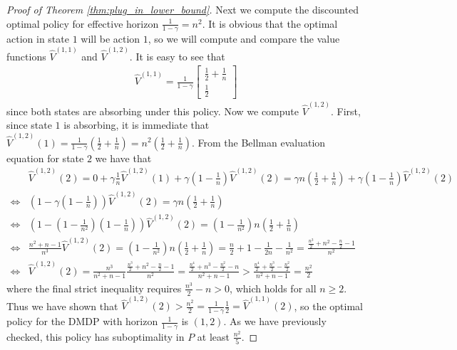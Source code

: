 \documentclass{article}
\theoremstyle{plain}
\theoremstyle{plain}
\theoremstyle{remark}
\theoremstyle{plain}
\theoremstyle{plain}
\newcommand{\Vhat}{\widehat{V}}
\begin{document}
\begin{proof}[Proof of Theorem \ref{thm:plug_in_lower_bound}]
Next we compute the discounted optimal policy for effective horizon $\frac{1}{1-\gamma} = n^2$. It is obvious that the optimal action in state $1$ will be action $1$, so we will compute and compare the value functions $\Vhat^{(1,1)}$ and $\Vhat^{(1,2)}$. It is easy to see that
\begin{align}
    \Vhat^{(1,1)} = \frac{1}{1-\gamma}\begin{bmatrix}
    \frac{1}{2} + \frac{1}{n } \\ \frac{1}{2} 
\end{bmatrix} \label{eq:1,1policy_valfn}
\end{align}
since both states are absorbing under this policy. Now we compute $\Vhat^{(1,2)}$. First, since state $1$ is absorbing, it is immediate that $\Vhat^{(1,2)}(1) = \frac{1}{1-\gamma} \left(\frac{1}{2} +\frac{1}{n} \right) = n^2 \left(\frac{1}{2} +\frac{1}{n} \right)$. From the Bellman evaluation equation for state $2$ we have that
\begin{align*}
    & \Vhat^{(1,2)}(2) = 0 + \gamma \frac{1}{n} \Vhat^{(1,2)}(1) + \gamma \left(1-\frac{1}{n}\right)   \Vhat^{(1,2)}(2) = \gamma n \left(\frac{1}{2} +\frac{1}{n} \right) + \gamma \left(1-\frac{1}{n}\right)   \Vhat^{(1,2)}(2) \\
    \iff & \left(1 - \gamma \left(1-\frac{1}{n}\right) \right) \Vhat^{(1,2)}(2) = \gamma n \left(\frac{1}{2} +\frac{1}{n} \right) \\
    \iff & \left(1 -  \left(1-\frac{1}{n^2}\right) \left(1-\frac{1}{n}\right) \right) \Vhat^{(1,2)}(2) =  \left(1-\frac{1}{n^2}\right) n \left(\frac{1}{2} +\frac{1}{n} \right) \\
    \iff & \frac{n^2 + n - 1}{n^3} \Vhat^{(1,2)}(2) =  \left(1-\frac{1}{n^2}\right) n \left(\frac{1}{2} +\frac{1}{n} \right) = \frac{n}{2} + 1 - \frac{1}{2n} - \frac{1}{n^2}  = \frac{\frac{n^3}{2} + n^2 - \frac{n}{2} - 1}{n^2}\\
     \iff &  \Vhat^{(1,2)}(2)  = \frac{n^3}{n^2 + n - 1} \frac{\frac{n^3}{2} + n^2 - \frac{n}{2} - 1}{n^2} = \frac{\frac{n^4}{2}+ n^3 - \frac{n^2}{2} - n}{n^2 + n - 1} > \frac{\frac{n^4}{2}+ \frac{n^3}{2} - \frac{n^2}{2}}{n^2 + n - 1} = \frac{n^2}{2}
\end{align*}
where the final strict inequality requires $\frac{n^3}{2}-n > 0$, which holds for all $n \geq 2$. Thus we have shown that $\Vhat^{(1,2)}(2) > \frac{n^2}{2} = \frac{1}{1-\gamma}\frac{1}{2} = \Vhat^{(1,1)}(2)$, so the optimal policy for the DMDP with horizon $\frac{1}{1-\gamma}$ is $(1,2)$.
As we have previously checked, this policy has suboptimality in $P$ at least $\frac{n^2}{5}$.


\end{proof}
\end{document}
